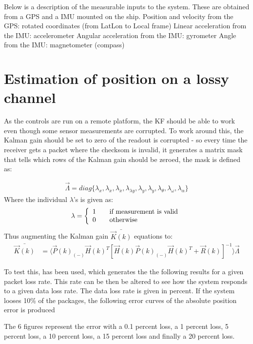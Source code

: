 Below is a description of the measurable inputs to the system. These are obtained from a \ac{GPS} and a \ac{IMU} mounted on the ship.
Position and velocity from the \ac{GPS}: rotated coordinates (from LatLon to Local frame)
Linear acceleration from the \ac{IMU}: accelerometer
Angular acceleration from the \ac{IMU}: gyrometer
Angle from the \ac{IMU}: magnetometer (compass)

\section{Estimation of position on a lossy channel}
As the controls are run on a remote platform, the \ac{KF} should be able to work even though some sensor measurements are corrupted. To work around this, the Kalman gain should be set to zero of the readout is corrupted - so every time the receiver gets a packet where the checksom is invalid, it generates a matrix mask that tells which rows of the Kalman gain should be zeroed, the mask is defined as:

\begin{align}
\vec{\Lambda} = diag\{\lambda_x,\lambda_{\dot{x}},\lambda_{\ddot{x}},\lambda_{\lambda{y}},\lambda_{\dot{y}},\lambda_{\ddot{y}},\lambda_{\theta},\lambda_{\omega},\lambda_{\alpha} \}
\end{align}
\noindent Where the individual $\lambda$'s is given as: 
\begin{align}
\lambda = 
\left\{ 
  \begin{array}{l l}
    1 & \quad \text{if measurement is valid}\\
    0 & \quad \text{otherwise}
  \end{array} \right.
\end{align}
Thus augmenting the Kalman gain $\bar{\vec{K}(k)}$ equations to:
\begin{align}
\bar{\vec{K}(k)} &= \langle\vec{P}(k)_{(-)} \vec{H}(k)^T [\vec{H}(k)\vec{P}(k)_{(-)} \vec{H}(k)^T + \vec{R}(k)]^{-1}\rangle\vec{\Lambda}
\end{align}

To test this, \MATLAB has been used, which generates the the following results for a given packet loss rate. This rate can be then be altered to see how the system responds to a given data loss rate. The data loss rate is given in percent. If the system looses 10\% of the packages, the following error curves of the absolute position error is produced

The 6 figures represent the error with a 0.1 percent loss, a 1 percent loss, 5 percent loss, a 10 percent loss, a 15 percent loss and finally a 20 percent loss. 

